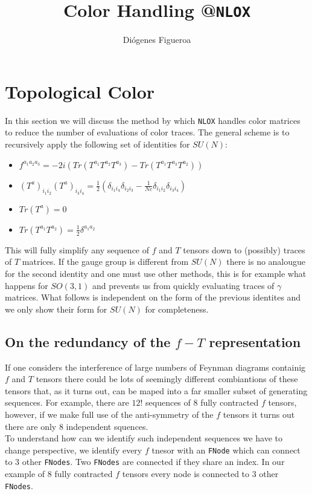 \documentclass[a4paper]{article}
\title{Color Handling @\texttt{NLOX}}
\author{Diógenes Figueroa}
\begin{document}
\maketitle
\section{Topological Color}
In this section we will discuss the method by which \texttt{NLOX} handles color matrices to reduce the number 
of evaluations of color traces. The general scheme is to recursively apply the following set of identities for 
$SU(N)$:

\begin{itemize}
 \item $f^{a_1a_2a_3} = -2i(Tr(T^{a_1} T^{a_2} T^{a_3})-Tr(T^{a_1} T^{a_3} T^{a_2}))$
 \item $(T^a)_{i_1i_2}(T^a)_{i_3i_4} = \frac{1}{2}\left(\delta_{i_1i_4}\delta_{i_2i_3} - \frac{1}{Nc}\delta_{i_1i_2}\delta_{i_3i_4}\right)$
 \item $Tr(T^a) = 0$
 \item $Tr(T^{a_1}T^{a_2})=\frac{1}{2}\delta^{a_1 a_2}$
\end{itemize}
This will fully simplify any sequence of $f$ and $T$ tensors down to (possibly) traces of $T$ matrices.
If the gauge group is different from $SU(N)$ there is no analougue for the second identity and one 
must use other methods, this is for example what happens for $SO(3,1)$ and prevents us from 
quickly evaluating traces of $\gamma$ matrices. What follows is independent on the form of the previous 
identites and we only show their form for $SU(N)$ for completeness.

\subsection{On the redundancy of the $f-T$ representation}
If one considers the interference of large numbers of Feynman diagrams containig $f$ and $T$ tensors there 
could be lots of seemingly different combiantions of these tensors that, as it turns out, can be maped into 
a far smaller subset of generating sequences. For example, there are $12!$ sequences of $8$ fully contracted $f$ tensors, however, if we make full use of the anti-symmetry of the $f$ tensors it turns out there are only $8$ independent squences.
\\ 

To understand how can we identify such independent sequences we have to change perspective, we identify every $f$ tnesor with an \texttt{FNode} which can connect to $3$ other \texttt{FNodes}.
Two \texttt{FNodes} are connected if they share an index. In our example of $8$ fully contracted $f$ tensors 
every node is connected to $3$ other \texttt{FNodes}.\\
\end{document}
